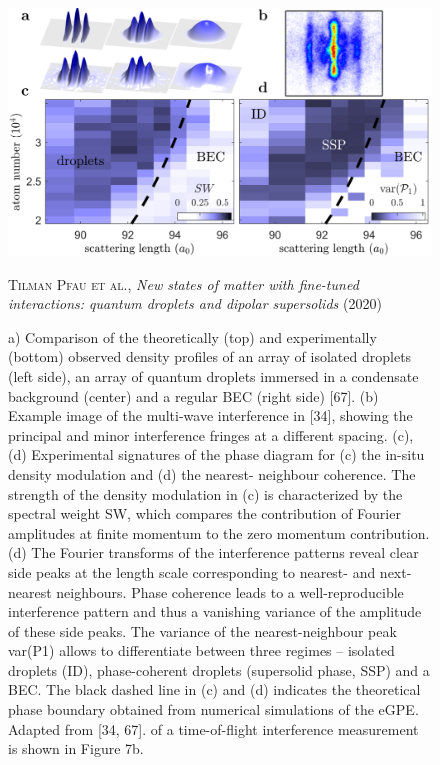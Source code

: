 \begin{figure}[H]
    \centering
    \includegraphics[width=1.0\textwidth]{IMAGE/supersolids_exist.png}\\
    \caption{
        a) Comparison of the theoretically (top) and experimentally (bottom)
        observed density profiles of an array of isolated droplets (left side), an array of quantum
        droplets immersed in a condensate background (center) and a regular BEC (right side)
        [67]. (b) Example image of the multi-wave interference in [34], showing the principal
        and minor interference fringes at a different spacing. (c), (d) Experimental signatures
        of the phase diagram for (c) the in-situ density modulation and (d) the nearest-
        neighbour coherence. The strength of the density modulation in (c) is characterized
        by the spectral weight SW, which compares the contribution of Fourier amplitudes at
        finite momentum to the zero momentum contribution. (d) The Fourier transforms of
        the interference patterns reveal clear side peaks at the length scale corresponding to
        nearest- and next-nearest neighbours. Phase coherence leads to a well-reproducible
        interference pattern and thus a vanishing variance of the amplitude of these side
        peaks.
        The variance of the nearest-neighbour peak var(P1) allows to differentiate
        between three regimes – isolated droplets (ID), phase-coherent droplets (supersolid
        phase, SSP) and a BEC. The black dashed line in (c) and (d) indicates the theoretical
        phase boundary obtained from numerical simulations of the eGPE. Adapted from
        [34, 67].
        of a time-of-flight interference measurement is shown in Figure 7b.
      }
    \textsc{Tilman Pfau et al.}, \emph{New states of matter with fine-tuned interactions: quantum droplets and dipolar supersolids} (2020)
    \label{fig:supersolids_exist}
\end{figure}

